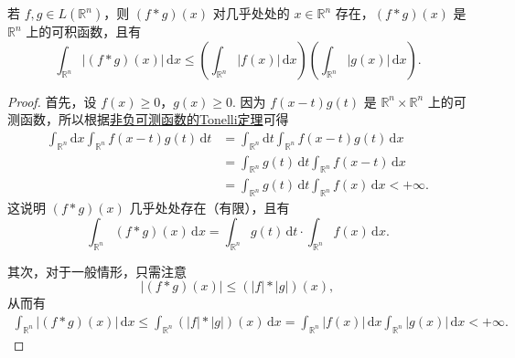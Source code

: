 \documentclass[../../main.tex]{subfiles}%
\begin{document}
\begin{theorem}
若 \( f, g \in L(\mathbb{R}^n) \)，则 \( (f * g)(x) \) 对几乎处处的 \( x \in \mathbb{R}^n \) 存在，\( (f * g)(x) \) 是 \( \mathbb{R}^n \) 上的可积函数，且有
\[
\int_{\mathbb{R}^n} |(f * g)(x)| \, \mathrm{d}x \leqslant \left( \int_{\mathbb{R}^n} |f(x)| \, \mathrm{d}x \right) \left( \int_{\mathbb{R}^n} |g(x)| \, \mathrm{d}x \right).
\]
\end{theorem}
\begin{proof}
首先，设 \( f(x) \geqslant  0 \)，\( g(x) \geqslant  0 \). 因为 \( f(x - t) g(t) \) 是 \( \mathbb{R}^n \times \mathbb{R}^n \) 上的可测函数，所以根据\hyperref[theorem:Tonelli定理(非负可测函数的情形)]{非负可测函数的Tonelli定理}可得
\begin{align*}
\int_{\mathbb{R}^n} \mathrm{d}x \int_{\mathbb{R}^n} f(x - t) g(t) \, \mathrm{d}t &= \int_{\mathbb{R}^n} \mathrm{d}t \int_{\mathbb{R}^n} f(x - t) g(t) \, \mathrm{d}x \\
&= \int_{\mathbb{R}^n} g(t) \, \mathrm{d}t \int_{\mathbb{R}^n} f(x - t) \, \mathrm{d}x \\
&= \int_{\mathbb{R}^n} g(t) \, \mathrm{d}t \int_{\mathbb{R}^n} f(x) \, \mathrm{d}x < +\infty.
\end{align*}
这说明 \( (f * g)(x) \) 几乎处处存在（有限），且有
\[
\int_{\mathbb{R}^n} (f * g)(x) \, \mathrm{d}x = \int_{\mathbb{R}^n} g(t) \, \mathrm{d}t \cdot \int_{\mathbb{R}^n} f(x) \, \mathrm{d}x.
\]

其次，对于一般情形，只需注意
\[
|(f * g)(x)| \leqslant  (|f| * |g|)(x),
\]
从而有
\begin{align*}
\int_{\mathbb{R}^n} |(f * g)(x)| \, \mathrm{d}x \leqslant  \int_{\mathbb{R}^n} (|f| * |g|)(x) \, \mathrm{d}x = \int_{\mathbb{R}^n} |f(x)| \, \mathrm{d}x \int_{\mathbb{R}^n} |g(x)| \, \mathrm{d}x < +\infty.
\end{align*}
\end{proof}
\end{document}
